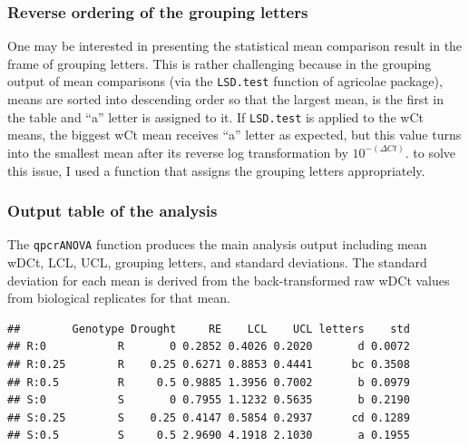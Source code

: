 \documentclass[
]{article}
\newenvironment{Shaded}{\begin{snugshade}}{\end{snugshade}}
\newcommand{\AttributeTok}[1]{\textcolor[rgb]{0.13,0.29,0.53}{#1}}
\newcommand{\CommentTok}[1]{\textcolor[rgb]{0.56,0.35,0.01}{\textit{#1}}}
\newcommand{\DecValTok}[1]{\textcolor[rgb]{0.00,0.00,0.81}{#1}}
\newcommand{\FunctionTok}[1]{\textcolor[rgb]{0.13,0.29,0.53}{\textbf{#1}}}
\newcommand{\NormalTok}[1]{#1}
\newcommand{\OtherTok}[1]{\textcolor[rgb]{0.56,0.35,0.01}{#1}}
\newcommand{\SpecialCharTok}[1]{\textcolor[rgb]{0.81,0.36,0.00}{\textbf{#1}}}
\newcommand{\StringTok}[1]{\textcolor[rgb]{0.31,0.60,0.02}{#1}}
\begin{document}
\hypertarget{reverse-ordering-of-the-grouping-letters}{%
\subsubsection{Reverse ordering of the grouping
letters}\label{reverse-ordering-of-the-grouping-letters}}

One may be interested in presenting the statistical mean comparison
result in the frame of grouping letters. This is rather challenging
because in the grouping output of mean comparisons (via the
\texttt{LSD.test} function of agricolae package), means are sorted into
descending order so that the largest mean, is the first in the table and
``a'' letter is assigned to it. If \texttt{LSD.test} is applied to the
wCt means, the biggest wCt mean receives ``a'' letter as expected, but
this value turns into the smallest mean after its reverse log
transformation by \(10^{-(\Delta Ct)}\). to solve this issue, I used a
function that assigns the grouping letters appropriately.

\hypertarget{output-table-of-the-analysis}{%
\subsubsection{Output table of the
analysis}\label{output-table-of-the-analysis}}

The \texttt{qpcrANOVA} function produces the main analysis output
including mean wDCt, LCL, UCL, grouping letters, and standard
deviations. The standard deviation for each mean is derived from the
back-transformed raw wDCt values from biological replicates for that
mean.

\begin{Shaded}
\end{Shaded}

\begin{verbatim}
##        Genotype Drought     RE    LCL    UCL letters    std
## R:0           R       0 0.2852 0.4026 0.2020       d 0.0072
## R:0.25        R    0.25 0.6271 0.8853 0.4441      bc 0.3508
## R:0.5         R     0.5 0.9885 1.3956 0.7002       b 0.0979
## S:0           S       0 0.7955 1.1232 0.5635       b 0.2190
## S:0.25        S    0.25 0.4147 0.5854 0.2937      cd 0.1289
## S:0.5         S     0.5 2.9690 4.1918 2.1030       a 0.1955
\end{verbatim}
\end{document}
